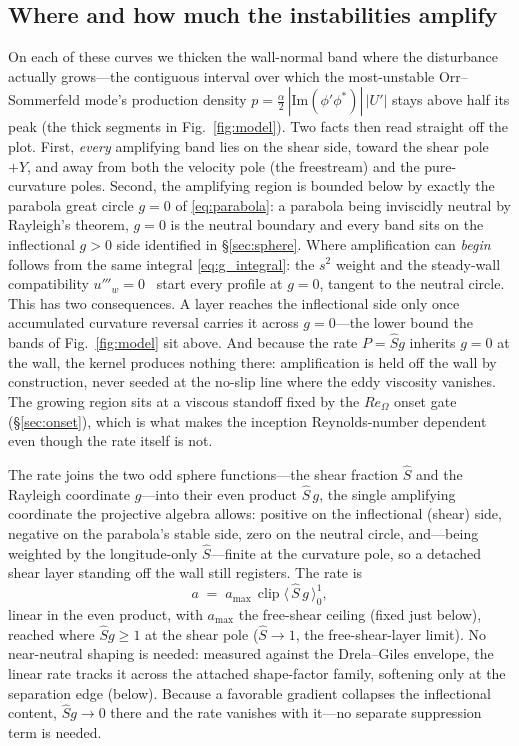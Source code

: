 \documentclass[journal]{new-aiaa}
\begin{document}
\subsection{Where and how much the instabilities amplify}%
\label{sec:live}\label{sec:rate}\label{sec:calib_rate}
On each of these curves we thicken the wall-normal band where the disturbance
actually grows---the contiguous interval over which the most-unstable
Orr--Sommerfeld mode's production density
$p=\tfrac{\alpha}{2}\,|\mathrm{Im}(\phi'\phi^{*})|\,|U'|$ stays above half its
peak (the thick segments in Fig.~\ref{fig:model}). Two facts then read straight
off the plot. First,
\emph{every} amplifying band lies on the shear side, toward the shear pole
$+Y$, and away from both the velocity pole (the freestream) and the
pure-curvature poles. Second, the amplifying region is bounded below by exactly
the parabola great circle $g=0$ of \eqref{eq:parabola}: a parabola being
inviscidly neutral by Rayleigh's theorem, $g=0$ is the neutral boundary and
every band sits on the inflectional $g>0$ side identified in
\S\ref{sec:sphere}. Where amplification can \emph{begin} follows from the same
integral \eqref{eq:g_integral}: the $s^2$ weight and the steady-wall
compatibility $u'''_w=0$~\cite{white_2006} start every profile at $g=0$, tangent
to the neutral circle. This has two consequences. A layer reaches the
inflectional side only once accumulated curvature reversal carries it across
$g=0$---the lower bound the bands of Fig.~\ref{fig:model} sit above. And because
the rate $P=\hat S g$ inherits $g=0$ at the wall, the kernel produces nothing
there: amplification is held off the wall by construction, never seeded at the
no-slip line where the eddy viscosity vanishes. The growing region sits at a
viscous standoff fixed by the $Re_\Omega$ onset gate (\S\ref{sec:onset}), which
is what makes the inception Reynolds-number dependent even though the rate itself
is not.


The rate joins the two odd sphere functions---the shear fraction $\hat S$ and
the Rayleigh coordinate $g$---into their even product $\hat S\,g$, the single amplifying coordinate the projective algebra allows: positive on the
inflectional (shear) side, negative on the parabola's stable side, zero on the
neutral circle, and---being weighted by the longitude-only $\hat S$---finite at
the curvature pole, so a detached shear layer standing off the wall still
registers. The rate is
\begin{equation}
  a \;=\; a_{\max}\,\operatorname{clip}\!\big\langle\, \hat S\,g\,\big\rangle_{0}^{1},
  \label{eq:rate}
\end{equation}
linear in the even product, with $a_{\max}$ the free-shear ceiling (fixed just
below), reached where $\hat S g\!\ge\!1$ at the shear pole ($\hat S\!\to\!1$, the
free-shear-layer limit). No
near-neutral shaping is needed: measured against the Drela--Giles envelope,
the linear rate tracks it across the attached shape-factor family, softening
only at the separation edge (below). Because a favorable gradient collapses the
inflectional content, $\hat S g\!\to\!0$ there and the rate vanishes with it---no
separate suppression term is needed.
\end{document}
